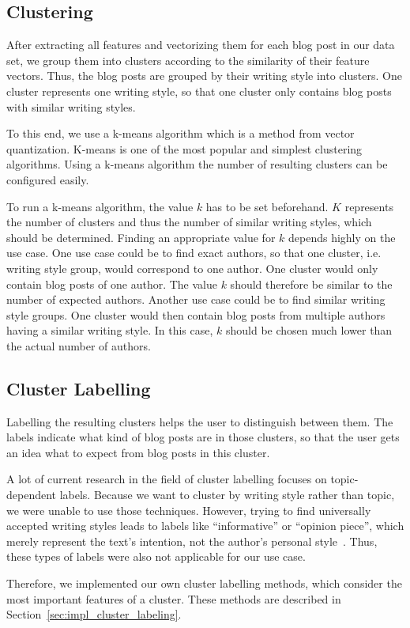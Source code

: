 
\subsection{Clustering}
\label{sec:clustering}

After extracting all features and vectorizing them for each blog post in our data set, we group them into clusters according to the similarity of their feature vectors.
Thus, the blog posts are grouped by their writing style into clusters.
One cluster represents one writing style, so that one cluster only contains blog posts with similar writing styles.


To this end, we use a k-means algorithm which is a method from vector quantization.
K-means is one of the most popular and simplest clustering algorithms.
Using a k-means algorithm the number of resulting clusters can be configured easily.


To run a k-means algorithm, the value $k$ has to be set beforehand.
$K$ represents the number of clusters and thus the number of similar writing styles, which should be determined.
Finding an appropriate value for $k$ depends highly on the use case.
One use case could be to find exact authors, so that one cluster, i.e. writing style group, would correspond to one author.
One cluster would only contain blog posts of one author.
The value $k$ should therefore be similar to the number of expected authors.
Another use case could be to find similar writing style groups.
One cluster would then contain blog posts from multiple authors having a similar writing style.
In this case, $k$ should be chosen much lower than the actual number of authors.




\subsection{Cluster Labelling}
\label{sec:cluster_labeling}

Labelling the resulting clusters helps the user to distinguish between them.
The labels indicate what kind of blog posts are in those clusters, so that the user gets an idea what to expect from blog posts in this cluster.


A lot of current research in the field of cluster labelling focuses on topic-dependent labels.
Because we want to cluster by writing style rather than topic, we were unable to use those techniques.
However, trying to find universally accepted writing styles leads to labels like ``informative'' or ``opinion piece'', which merely represent the text's intention, not the author's personal style~\cite{lee2001genres}.
Thus, these types of labels were also not applicable for our use case.


Therefore, we implemented our own cluster labelling methods, which consider the most important features of a cluster.
These methods are described in Section~\ref{sec:impl_cluster_labeling}.